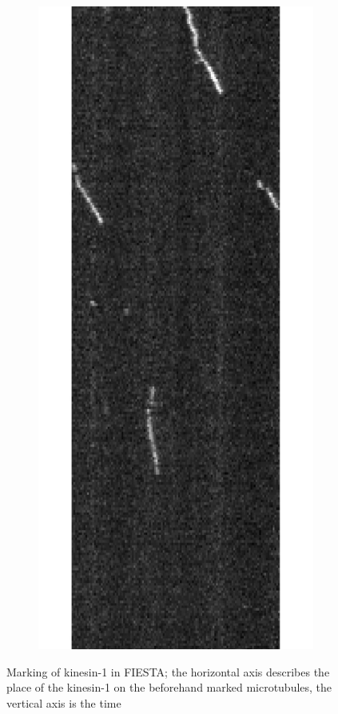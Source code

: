 \documentclass[english, %
parskip=full, %
bibliography=totoc, %
]{scrartcl}
\begin{document}
\begin{figure}[!ht]
\begin{subfigure}[b]{0.4\textwidth}
	\end{subfigure}
	\begin{subfigure}[b]{0.4\textwidth}
	   \includegraphics[width=\textwidth]{Auswertungsbild_unten}
	\end{subfigure}
  \caption{Marking of kinesin-1 in FIESTA; the horizontal axis describes the place of the kinesin-1 on the beforehand marked microtubules, the vertical axis is the time}
	\label{fig:kmarking}
\end{figure}
\end{document}
